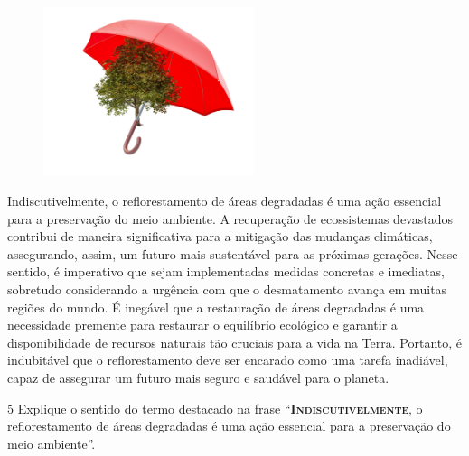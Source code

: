 \begin{myquote}


\begin{figure}  %
  \centering
  \includegraphics[width=0.55\textwidth]{./imgSAEB_7_POR/media/image49.png}
\end{figure}
Indiscutivelmente, o reflorestamento de áreas degradadas é uma ação essencial
para a preservação do meio ambiente. A recuperação de
ecossistemas devastados contribui de maneira significativa para a mitigação das
mudanças climáticas, assegurando, assim, um futuro mais sustentável para as
próximas gerações. Nesse sentido, é imperativo que sejam implementadas medidas
concretas e imediatas, sobretudo considerando a urgência com que o
desmatamento avança em muitas regiões do mundo. É inegável que a restauração
de áreas degradadas é uma necessidade premente para restaurar o equilíbrio
ecológico e garantir a disponibilidade de recursos naturais tão cruciais para
a vida na Terra. Portanto, é indubitável que o reflorestamento deve ser
encarado como uma tarefa inadiável, capaz de assegurar um futuro mais seguro e
saudável para o planeta.



\end{myquote}

\num{5} Explique o sentido do termo destacado na frase ``\textsc{\textbf{Indiscutivelmente}}, o
reflorestamento de áreas degradadas é uma ação essencial para a preservação do
meio ambiente''.


